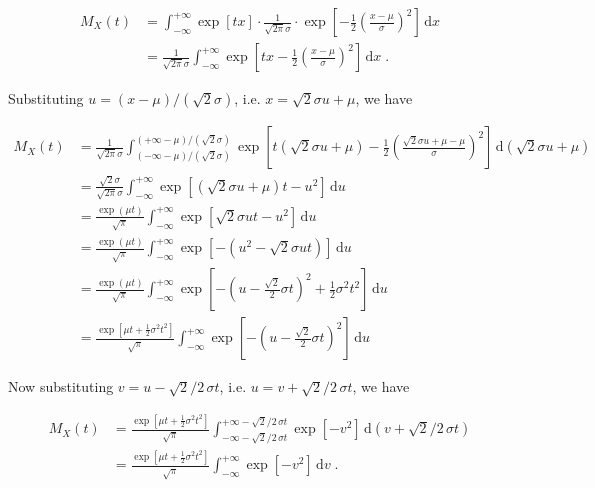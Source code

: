 \documentclass[a4paper,12pt,twoside]{book}
\begin{document}
\begin{equation} \label{eq:norm-mgf-norm-mgf-s1}
\begin{split}
M_X(t) &= \int_{-\infty}^{+\infty} \exp[tx] \cdot \frac{1}{\sqrt{2 \pi} \sigma} \cdot \exp \left[ -\frac{1}{2} \left( \frac{x-\mu}{\sigma} \right)^2 \right] \, \mathrm{d}x \\
&= \frac{1}{\sqrt{2 \pi} \sigma} \int_{-\infty}^{+\infty} \exp\left[ tx - \frac{1}{2} \left( \frac{x-\mu}{\sigma} \right)^2 \right] \, \mathrm{d}x \; .
\end{split}
\end{equation}

Substituting $u = (x-\mu)/(\sqrt{2}\sigma)$, i.e. $x = \sqrt{2}\sigma u + \mu$, we have

\begin{equation} \label{eq:norm-mgf-norm-mgf-s2}
\begin{split}
M_X(t) &= \frac{1}{\sqrt{2 \pi} \sigma} \int_{(-\infty-\mu)/(\sqrt{2}\sigma)}^{(+\infty-\mu)/(\sqrt{2}\sigma)} \exp\left[ t\left( \sqrt{2} \sigma u + \mu \right) - \frac{1}{2} \left( \frac{ \sqrt{2} \sigma u + \mu - \mu}{\sigma} \right)^2 \right] \, \mathrm{d}\left( \sqrt{2} \sigma u + \mu \right) \\
&= \frac{\sqrt{2} \sigma}{\sqrt{2 \pi} \sigma} \int_{-\infty}^{+\infty} \exp\left[ \left( \sqrt{2} \sigma u + \mu \right) t - u^2 \right] \, \mathrm{d}u \\
&= \frac{\exp(\mu t)}{\sqrt{\pi}} \int_{-\infty}^{+\infty} \exp\left[ \sqrt{2} \sigma u t - u^2 \right] \, \mathrm{d}u \\
&= \frac{\exp(\mu t)}{\sqrt{\pi}} \int_{-\infty}^{+\infty} \exp\left[ - \left( u^2 - \sqrt{2} \sigma u t \right) \right] \, \mathrm{d}u \\
&= \frac{\exp(\mu t)}{\sqrt{\pi}} \int_{-\infty}^{+\infty} \exp\left[ - \left( u - \frac{\sqrt{2}}{2} \sigma t \right)^2 + \frac{1}{2} \sigma^2 t^2 \right] \, \mathrm{d}u \\
&= \frac{\exp\left[ \mu t + \frac{1}{2} \sigma^2 t^2 \right]}{\sqrt{\pi}} \int_{-\infty}^{+\infty} \exp\left[ - \left( u - \frac{\sqrt{2}}{2} \sigma t \right)^2 \right] \, \mathrm{d}u
\end{split}
\end{equation}

Now substituting $v = u - \sqrt{2}/2 \, \sigma t$, i.e. $u = v + \sqrt{2}/2 \, \sigma t$, we have

\begin{equation} \label{eq:norm-mgf-norm-mgf-s3}
\begin{split}
M_X(t) &= \frac{\exp\left[ \mu t + \frac{1}{2} \sigma^2 t^2 \right]}{\sqrt{\pi}} \int_{-\infty - \sqrt{2}/2 \, \sigma t}^{+\infty - \sqrt{2}/2 \, \sigma t} \exp\left[ -v^2 \right] \, \mathrm{d}\left( v + \sqrt{2}/2 \, \sigma t \right) \\
&= \frac{\exp\left[ \mu t + \frac{1}{2} \sigma^2 t^2 \right]}{\sqrt{\pi}} \int_{-\infty}^{+\infty} \exp\left[ -v^2 \right] \, \mathrm{d}v \; .
\end{split}
\end{equation}
\end{document}
